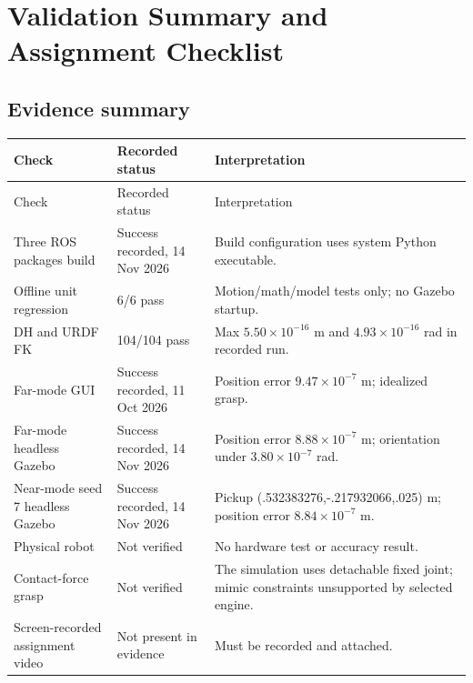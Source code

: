 \chapter{Validation Summary and Assignment Checklist}
\label{app:checklist}

\section{Evidence summary}
\begin{longtable}{p{}p{}p{}}
\toprule Check & Recorded status & Interpretation\\\midrule\endfirsthead
\toprule Check & Recorded status & Interpretation\\\midrule\endhead
Three ROS packages build & Success recorded, 14 Nov 2026 & Build configuration uses system Python executable.\\
Offline unit regression & 6/6 pass & Motion/math/model tests only; no Gazebo startup.\\
DH and URDF FK & 104/104 pass & Max $5.50\times10^{-16}$ m and $4.93\times10^{-16}$ rad in recorded run.\\
Far-mode GUI & Success recorded, 11 Oct 2026 & Position error $9.47\times10^{-7}$ m; idealized grasp.\\
Far-mode headless Gazebo & Success recorded, 14 Nov 2026 & Position error $8.88\times10^{-7}$ m; orientation under $3.80\times10^{-7}$ rad.\\
Near-mode seed 7 headless Gazebo & Success recorded, 14 Nov 2026 & Pickup (.532383276,-.217932066,.025) m; position error $8.84\times10^{-7}$ m.\\
Physical robot & Not verified & No hardware test or accuracy result.\\
Contact-force grasp & Not verified & The simulation uses detachable fixed joint; mimic constraints unsupported by selected engine.\\
Screen-recorded assignment video & Not present in evidence & Must be recorded and attached.\\
\bottomrule
\end{longtable}

